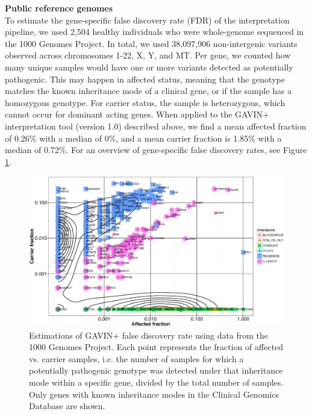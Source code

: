 \noindent\textbf{Public reference genomes}\\
To estimate the gene-specific false discovery rate (FDR) of the interpretation pipeline, we used 2,504 healthy individuals who were whole-genome sequenced in the 1000 Genomes Project\cite{Auton_2015}.
In total, we used 38,097,906 non-intergenic variants observed across chromosomes 1-22, X, Y, and MT.
Per gene, we counted how many unique samples would have one or more variants detected as potentially pathogenic.
This may happen in affected status, meaning that the genotype matches the known inheritance mode of a clinical gene, or if the sample has a homozygous genotype.
For carrier status, the sample is heterozygous, which cannot occur for dominant acting genes.
When applied to the GAVIN+ interpretation tool (version 1.0) described above, we find a mean affected fraction of 0.26\% with a median of 0\%, and a mean carrier fraction is 1.85\% with a median of 0.72\%.
For an overview of gene-specific false discovery rates, see Figure \ref{fig:frameworkforgenomics_fdr}.\\

\begin{figure}
\centering
\includegraphics[width=1.0\linewidth]{img/frameworkforgenomics_fdr}
\caption[Estimations of GAVIN+ false discovery rate]{Estimations of GAVIN+ false discovery rate using data from the 1000 Genomes Project. Each point represents the fraction of affected vs. carrier samples, i.e. the number of samples for which a potentially pathogenic genotype was detected under that inheritance mode within a specific gene, divided by the total number of samples. Only genes with known inheritance modes in the Clinical Genomics Database are shown.}
\label{fig:frameworkforgenomics_fdr}
\end{figure}

